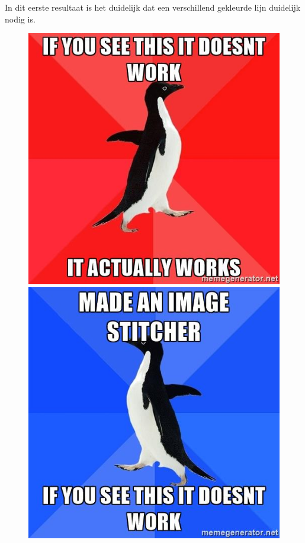 \documentclass{article}
\begin{document}
In dit eerste resultaat is het duidelijk dat een verschillend gekleurde lijn duidelijk nodig is.
\begin{figure}[h!]
\centering
\includegraphics[scale=0.2]{../myexamples/meme1.png}
\includegraphics[scale=0.2]{../myexamples/meme2.png}

\end{figure}
\end{document}
